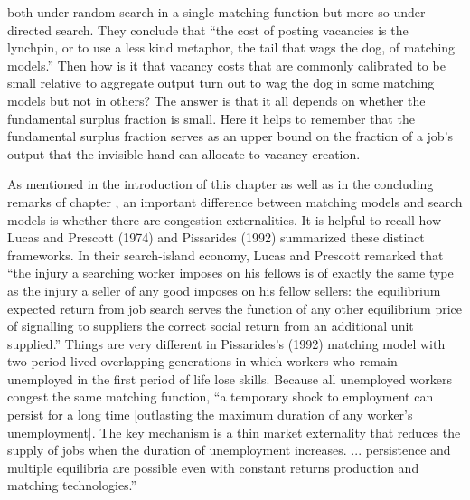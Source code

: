 both under random search in a single matching function but more so
under directed search.
They conclude that ``the cost of posting vacancies is the
lynchpin, or to use a less kind metaphor, the tail that wags the
dog, of matching models.'' Then how is it that vacancy costs that are
commonly calibrated to be small relative to aggregate output turn out to  wag
the dog in some matching models  but not in others? The answer is that it all
depends  on whether  the fundamental surplus
fraction is small.  Here it helps to remember that the fundamental surplus fraction serves as  an upper bound on the fraction of a job's output
that the invisible hand can allocate to vacancy creation.
%


As mentioned in the introduction of this chapter as well as
in the concluding remarks of chapter ,
an important difference between  matching models and search models
is whether  there are congestion externalities.  It is helpful to recall how  Lucas
and Prescott (1974) and Pissarides (1992) summarized  these distinct frameworks.  In their search-island
economy, Lucas and Prescott remarked that ``the injury a
searching worker imposes on his fellows is of exactly the same
type as the injury a seller of any good imposes on his fellow
sellers: the equilibrium expected return from job search serves
the function of any other equilibrium price of signalling to
suppliers the correct social return from an additional unit
supplied.'' Things are very different in Pissarides's
(1992) matching model with two-period-lived overlapping
generations in which workers who remain unemployed in the first period of life
lose skills. Because all unemployed workers congest the same
matching function, ``a temporary shock to employment can persist
for a long time [outlasting the maximum duration of any worker's
unemployment]. The key mechanism is a thin market externality
that reduces the supply of jobs when the duration of unemployment
increases. ... persistence and multiple equilibria are possible
even with constant returns production and matching technologies.''

